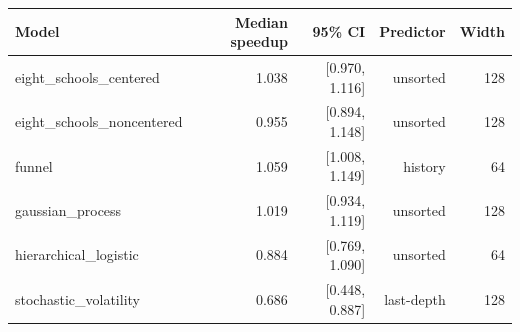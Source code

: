 \begin{tabular}{lrrrr}
\toprule
Model & Median speedup & 95\% CI & Predictor & Width \\
\midrule
eight\_schools\_centered & 1.038 & [0.970, 1.116] & unsorted & 128 \\
eight\_schools\_noncentered & 0.955 & [0.894, 1.148] & unsorted & 128 \\
funnel & 1.059 & [1.008, 1.149] & history & 64 \\
gaussian\_process & 1.019 & [0.934, 1.119] & unsorted & 128 \\
hierarchical\_logistic & 0.884 & [0.769, 1.090] & unsorted & 64 \\
stochastic\_volatility & 0.686 & [0.448, 0.887] & last-depth & 128 \\
\bottomrule
\end{tabular}
